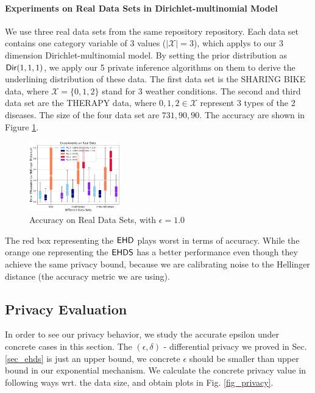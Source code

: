 \documentclass{article}
\begin{document}
\paragraph{Experiments on Real Data Sets in Dirichlet-multinomial Model}
We use three real data sets from the same repository repository. Each data set contains one category variable of 3 values ($|\mathcal{X}| = 3$), which applys to our 3 dimension Dirichlet-multinomial model. By setting the prior distribution as $\mathsf{Dir}(1,1,1)$, we apply our 5 private inference algorithms on them to derive the underlining distribution of these data. The first data set is the SHARING BIKE data, where $\mathcal{X} = \{0,1,2\}$ stand for 3 weather conditions. The second and third data set are the THERAPY data, where $0,1,2 \in \mathcal{X}$ represent 3 types of the 2 diseases. The size of the four data set are $731, 90, 90$. The accuracy are shown in Figure \ref{fig_real_3d}.
\begin{figure}
\centering
\includegraphics[width=0.35\textwidth]{realdata_3d.eps}
\caption{Accuracy on Real Data Sets, with $\epsilon = 1.0$}
\label{fig_real_3d}
\end{figure}

The red box representing the $\mathsf{EHD}$ plays worst in terms of accuracy. While the orange one representing the $\mathsf{EHDS}$ has a better performance even though they achieve the same privacy bound, because we are calibrating noise to the Hellinger distance (the accuracy metric we are using).

\subsection{Privacy Evaluation}
\label{subsec_experiment_privacy}
In order to see our privacy behavior, we study the accurate epsilon under concrete cases in this section. The $(\epsilon, \delta)$ - differential privacy we proved in Sec. \ref{sec_ehds} is just an upper bound, we concrete $\epsilon$ should be smaller than upper bound in our exponential mechanism. We calculate the concrete privacy value in following ways wrt. the data size, and obtain plots in Fig. \ref{fig_privacy}.
\end{document}
